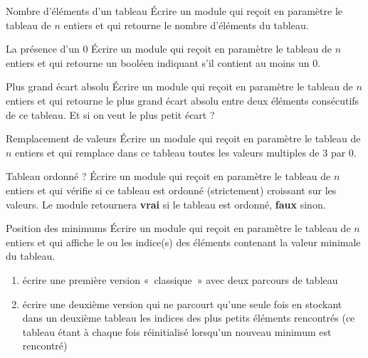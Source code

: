 \bigskip\bigskip\bigskip

\begin{Exercice}{Nombre d'éléments d'un tableau}
	Écrire un module qui reçoit en paramètre le tableau
	 de $n$ entiers et qui
	retourne le nombre d’éléments du tableau.
\end{Exercice}

\begin{Exercice}{La présence d'un 0}
	Écrire un module qui reçoit en paramètre le tableau
	 de $n$ entiers 
	et qui retourne un booléen 
	indiquant s'il contient au moins un 0. 
\end{Exercice}

\begin{Exercice}{Plus grand écart absolu}
	Écrire un module qui reçoit en paramètre le tableau
	 de $n$ entiers et qui
	retourne le plus grand écart absolu entre deux éléments consécutifs de
	ce tableau.
	Et si on veut le plus petit écart ?
\end{Exercice}

\begin{Exercice}{Remplacement de valeurs}
	Écrire un module qui reçoit en paramètre le tableau
	 de $n$ entiers et qui
	remplace dans ce tableau toutes les valeurs multiples de 3 par 0.
\end{Exercice}

\begin{Exercice}{Tableau ordonné ?}
	Écrire un module qui reçoit en paramètre le tableau
	 de $n$ entiers et qui
	vérifie si ce tableau est ordonné (strictement) croissant sur les
	valeurs. Le module retournera \textbf{vrai} si le tableau est ordonné,
	\textbf{faux} sinon.
\end{Exercice}

\begin{Exercice}{Position des minimums}
	Écrire un module qui reçoit en paramètre le tableau
	 de $n$ entiers et qui
	affiche le ou les indice(s) des éléments contenant la valeur minimale
	du tableau.

	\begin{enumerate}[label=\alph*)]
	\item 
		écrire une première version «~classique~» avec deux parcours de tableau
	\item
		écrire une deuxième version qui ne parcourt qu’une seule fois 
		 en
		stockant dans un deuxième tableau les indices des plus petits éléments
		rencontrés (ce tableau étant à chaque fois réinitialisé lorsqu’un
		nouveau minimum est rencontré)
	\end{enumerate}
\end{Exercice}

